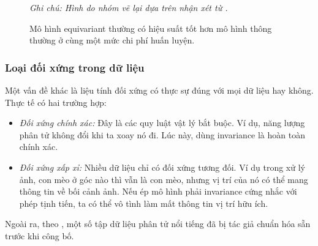 \begin{figure}[H]
    \centering
    \caption[Tác động của tính đối xứng lên scaling laws]{Mô hình equivariant thường có hiệu suất tốt hơn mô hình thông thường ở cùng một mức chi phí huấn luyện.}
    \label{fig:scaling-law-equivariant}
    \vspace{2mm}

    \centering\textit{Ghi chú: Hình do nhóm vẽ lại dựa trên nhận xét từ \cite{jegelka2025tutorial}.}
\end{figure}

\subsubsection{Loại đối xứng trong dữ liệu}

Một vấn đề khác là liệu tính đối xứng có thực sự đúng với mọi dữ liệu hay không. Thực tế có hai trường hợp:

\begin{itemize}
    \item \textit{Đối xứng chính xác:} Đây là các quy luật vật lý bắt buộc. Ví dụ, năng lượng phân tử không đổi khi ta xoay nó đi. Lúc này, dùng invariance là hoàn toàn chính xác.
    \item \textit{Đối xứng xấp xỉ:} Nhiều dữ liệu chỉ có đối xứng tương đối. Ví dụ trong xử lý ảnh, con mèo ở góc nào thì vẫn là con mèo, nhưng vị trí của nó có thể mang thông tin về bối cảnh ảnh. Nếu ép mô hình phải invariance cứng nhắc với phép tịnh tiến, ta có thể vô tình làm mất thông tin vị trí hữu ích.
\end{itemize}

Ngoài ra, theo \cite{jegelka2025tutorial}, một số tập dữ liệu phân tử nổi tiếng đã bị tác giả chuẩn hóa sẵn trước khi công bố. 

